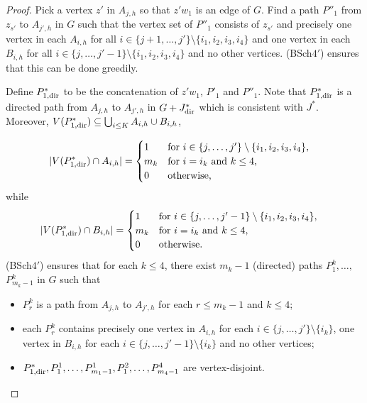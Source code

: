 \documentclass{memo-l}
\def\COMMENT#1{}
\numberwithin{section}{chapter}
\numberwithin{equation}{section}
\numberwithin{firstthm}{section}
\numberwithin{figure}{section}
\begin{document}
{\begin{proof}
Pick a vertex $z'$ in $A_{j,h}$ so that $z' w_1 $ is an edge of $G$.
Find a path $P''_1$ from $z_{s'}$ to $A_{j',h}$ in $G$ such that the vertex set of $P''_1$ consists of $z_{s'}$ and precisely one vertex in
each $A_{i,h}$ for all $i \in \{j+1, \dots, j' \} \setminus \{i_1, i_2, i_3, i_4 \}$ 
and one vertex in each $B_{i,h}$ for all $i \in \{j, \dots, j'-1 \} \setminus \{i_1, i_2, i_3, i_4 \}$ and no other vertices.
(BSch$4'$) ensures that this can be done greedily.%
    \COMMENT{Daniela replaced (BSch$3'$) by (BSch$4'$)}
Define $P^*_{1,{\rm dir}}$ to be the concatenation of $z'w_1$, $P'_1$ and $P''_1$.
Note that $P^*_{1,{\rm dir}}$ is a directed path from $A_{j,h}$ to $A_{j',h}$ in $G + J^*_{\rm dir}$ which is consistent with $J^*$.
Moreover, $V(P^*_{1,{\rm dir}}) \subseteq \bigcup_{i \le K} A_{i,h} \cup B_{i,h}$,%
\COMMENT{AL: added $V(P^*_{1,{\rm dir}}) \subseteq \bigcup_{i \le K} A_{i,h} \cup B_{i,h}$}
\begin{align*}
	 |V(P^*_{1,{\rm dir}}) \cap A_{i,h}| &= 
	 \begin{cases}
	1	& \textrm{for $i \in \{j, \dots, j'\} \setminus \{i_1, i_2, i_3, i_4 \}$,}\\
	m_k	& \textrm{for $i = i_k$ and $k \le 4$,}\\
	0	& \textrm{otherwise,}
	 \end{cases}
\end{align*}
while	 
\begin{align*}
	  	 |V(P^*_{1,{\rm dir}}) \cap B_{i,h}| & = 
	 \begin{cases}
	1	& \textrm{for $i \in \{j, \dots, j'-1\} \setminus \{i_1, i_2, i_3, i_4 \}$},\\
	m_k	& \textrm{for $i = i_k$ and $k \le 4$},\\
	0	& \textrm{otherwise.}
	 \end{cases}
\end{align*}
(BSch$4'$) ensures that for each $k \le 4$, there exist $m_k-1$ (directed) paths $P_1^{k}, \dots,$ $ P_{m_{k}-1}^{k}$ in $G$ such that 
\begin{itemize}
	\item $P_r^{k}$ is a path from $A_{j,h}$ to $A_{j',h}$ for each $r\le m_k-1$ and $k \le 4$;
	\item each $P_r^{k}$ contains precisely one vertex in $A_{i,h}$ for each $i\in \{j, \dots, j'\} \setminus \{i_k\}$,
one vertex in $B_{i,h}$ for each $i\in \{j, \dots, j'-1\} \setminus \{i_k\}$ and no other vertices;
	\item $P^*_{1,{\rm dir}},P_1^{1},\dots, P_{ m_{1}-1}^{1},P_1^2, \dots, P_{m_4-1}^4$  are vertex-disjoint.

\end{itemize}
\end{proof}}
\end{document}
